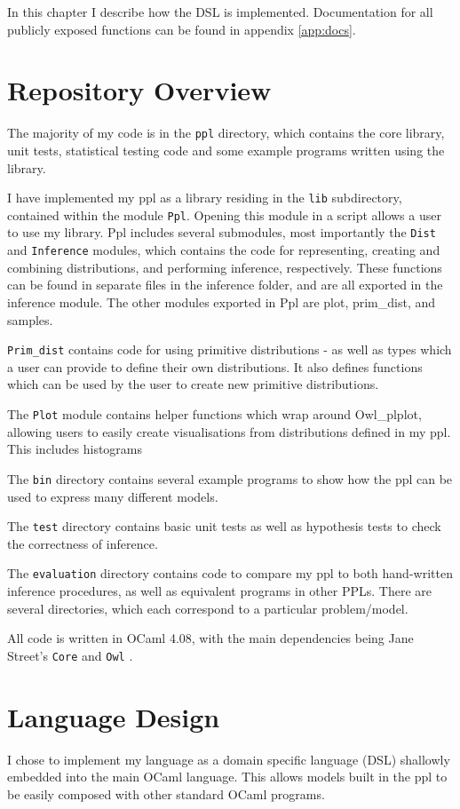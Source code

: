 In this chapter I describe how the DSL is implemented. Documentation for all publicly exposed functions can be found in appendix \ref{app:docs}.

\section{Repository Overview}
The majority of my code is in the \texttt{ppl} directory, which contains the core library, unit tests, statistical testing code and some example programs written using the library.

I have implemented my ppl as a library residing in the \texttt{lib} subdirectory, contained within the module \texttt{Ppl}. Opening this module in a script allows a user to use my library. Ppl includes several submodules, most importantly the \texttt{Dist} and \texttt{Inference} modules, which contains the code for representing, creating and combining distributions, and performing inference, respectively. These functions can be found in separate files in the inference folder, and are all exported in the inference module. The other modules exported in Ppl are plot, prim\_dist, and samples.

\texttt{Prim\_dist} contains code for using primitive distributions - as well as types which a user can provide to define their own distributions. It also defines functions which can be used by the user to create new primitive distributions.

The \texttt{Plot} module contains helper functions which wrap around Owl\_plplot, allowing users to easily create visualisations from distributions defined in my ppl. This includes histograms 

The \texttt{bin} directory contains several example programs to show how the ppl can be used to express many different models. 

The \texttt{test} directory contains basic unit tests as well as hypothesis tests to check the correctness of inference.

The \texttt{evaluation} directory contains code to compare my ppl to both hand-written inference procedures, as well as equivalent programs in other PPLs. There are several directories, which each correspond to a particular problem/model.

All code is written in OCaml 4.08, with the main dependencies being Jane Street's \texttt{Core} and \texttt{Owl} \cite{owl}.

\section{Language Design}
I chose to implement my language as a domain specific language (DSL) shallowly embedded into the main OCaml language. This allows models built in the ppl to be easily composed with other standard OCaml programs.

